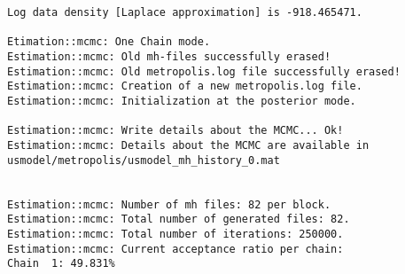 \documentclass[]{article}
\begin{document}
\begin{verbatim}
Log data density [Laplace approximation] is -918.465471.

Etimation::mcmc: One Chain mode.
Estimation::mcmc: Old mh-files successfully erased!
Estimation::mcmc: Old metropolis.log file successfully erased!
Estimation::mcmc: Creation of a new metropolis.log file.
Estimation::mcmc: Initialization at the posterior mode.

Estimation::mcmc: Write details about the MCMC... Ok!
Estimation::mcmc: Details about the MCMC are available in usmodel/metropolis/usmodel_mh_history_0.mat


Estimation::mcmc: Number of mh files: 82 per block.
Estimation::mcmc: Total number of generated files: 82.
Estimation::mcmc: Total number of iterations: 250000.
Estimation::mcmc: Current acceptance ratio per chain: 
Chain  1: 49.831%


\end{verbatim}
\end{document}
